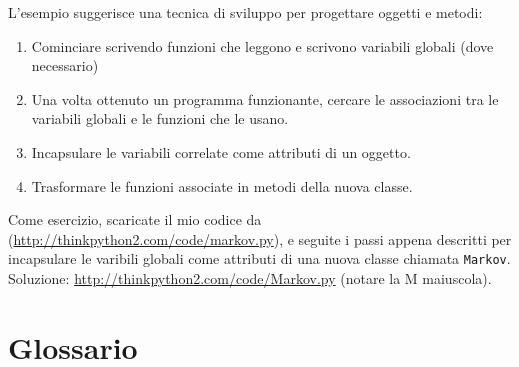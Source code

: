 \documentclass[10pt]{book}
\begin{document}
L'esempio suggerisce una tecnica di sviluppo per progettare oggetti e metodi:

\begin{enumerate}

\item Cominciare scrivendo funzioni che leggono e scrivono variabili globali (dove necessario)

\item Una volta ottenuto un programma funzionante, cercare le associazioni tra le variabili globali e le funzioni che le usano.

\item Incapsulare le variabili correlate come attributi di un oggetto.

\item Trasformare le funzioni associate in metodi della nuova classe.

\end{enumerate}

Come esercizio, scaricate il mio codice da
(\url{http://thinkpython2.com/code/markov.py}), e seguite i passi appena descritti per incapsulare le varibili globali come attributi di una nuova classe chiamata {\tt Markov}.  Soluzione: \url{http://thinkpython2.com/code/Markov.py} (notare la M maiuscola).


\section{Glossario}
\end{document}
